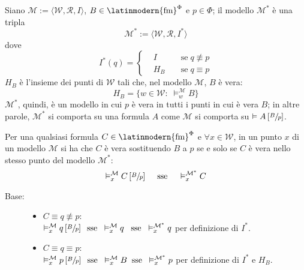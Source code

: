 \documentclass[a4paper,12pt]{article}
\newcommand{\latinmath}[1]{\text{\latinmodern{#1}}} %
\begin{document}
\begin{description}
\begin{dimo}
		\hypertarget{mod*}{}
		\begin{defin}
			 Siano $\mathcal{M} := \langle \mathcal{W}, \mathcal{R}, I \rangle$, $B \in \latinmath{fm}^{\Phi}$ e $p \in \Phi$; il modello $\mathcal{M}^{\ast}$ è una tripla
			$$\mathcal{M}^{\ast} := \langle \mathcal{W}, \mathcal{R}, I^{\ast} \rangle $$
			dove
			$$I^{\ast}(q) = \left\{
			\begin{aligned}
				&I \; && \text{se} \; q \not\equiv p \\
				&H_B \; && \text{se} \; q \equiv p
			\end{aligned}
			\right.$$
			$H_B$ è l'insieme dei punti di $\mathcal{W}$ tali che, nel modello $\mathcal{M}$, $B$ è vera: $$H_B = \{w \in \mathcal{W} : \; \vDash_w^{\mathcal{M}} B\}$$
			$\mathcal{M}^{\ast}$, quindi, è un modello in cui $p$ è vera in tutti i punti in cui è vera $B$; in altre parole, $\mathcal{M}^{\ast}$ si comporta su una formula $A$ come $\mathcal{M}$ si comporta su $\vDash A \left[\sfrac{B}{p}\right]$. \\
		\end{defin}
		\hypertarget{lemdif}{}
		\begin{lem}
			 Per una qualsiasi formula $C \in \latinmath{fm}^{\Phi}$ e $\forall x \in \mathcal{W}$, in un punto $x$ di un modello $\mathcal{M}$ si ha che $C$ è vera sostituendo $B$ a $p$ se e solo se $C$ è vera nello stesso punto del modello $\mathcal{M}^{\ast}$:
			$$\vDash_x^{\mathcal{M}} C \left[\sfrac{B}{p}\right] \quad\; \text{sse} \quad\; \vDash_x^{\mathcal{M^{\ast}}} C$$
		\end{lem}
		\begin{dimo}
			 \phantom{ciao} 
			\begin{description}
				\item[Base:] \phantom{ciao}
				\begin{itemize}
					\item $C \equiv q \not\equiv p$: \\
					$\vDash_x^{\mathcal{M}} q \left[\sfrac{B}{p}\right] \;\; \text{sse} \;\; \vDash_x^{\mathcal{M}} q \;\; \; \text{sse}\;\; \vDash_x^{\mathcal{M^{\ast}}} q$ \quad per definizione di $I^{\ast}$.
					\item $C \equiv q \equiv p$: \\
					$\vDash_x^{\mathcal{M}} p \left[\sfrac{B}{p}\right] \;\; \text{sse} \;\; \vDash_x^{\mathcal{M}} B \;\; \text{sse} \;\; \vDash_x^{\mathcal{M^{\ast}}} p$ \quad per definizione di $I^{\ast}$ e $H_B$.

\end{itemize}
\end{description}
\end{dimo}
\end{dimo}
\end{description}
\end{document}
